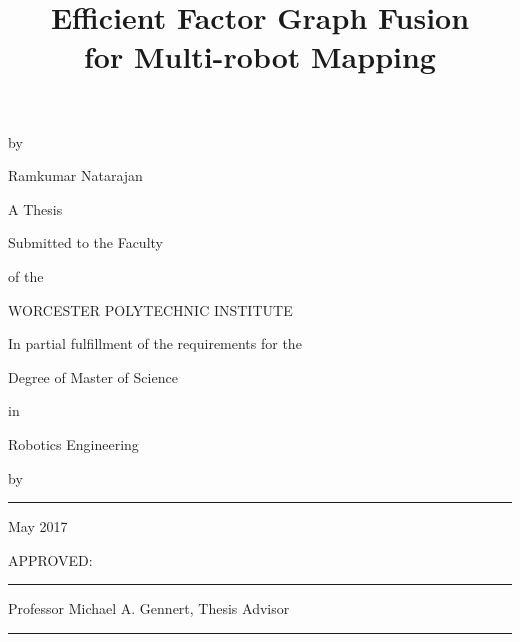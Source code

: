 \thispagestyle{empty}

\begin{center}

\brk


\title  {Efficient Factor Graph Fusion \\ for Multi-robot Mapping}
\maketitle

\brk
by

\brk
Ramkumar Natarajan


\brk\brk
A Thesis

\brk
Submitted to the Faculty

\brk
of the 

\brk
WORCESTER POLYTECHNIC INSTITUTE
	
\brk
In partial fulfillment of the requirements for the

\brk
Degree of Master of Science

\brk
in

\brk
Robotics Engineering

\brk
by

\brk\brk
\rule{3in}{1.2pt}

\brk
May 2017

\end{center}

	
\vfill
APPROVED:

\vspace{0.5in}
\rule{3in}{0.8pt}

Professor Michael A. Gennert, Thesis Advisor

\vspace{0.5in}
\rule{3in}{0.8pt}

